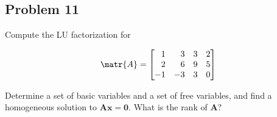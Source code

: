 \subsection{Problem 11}

Compute the LU factorization for

\begin{equation*}
    \matr{A} = 
    \begin{bmatrix}
    \phantom{-}1 & \phantom{-}3 & 3 & 2 \\
    \phantom{-}2 & \phantom{-}6 & 9 & 5 \\
    -1 & -3 & 3 & 0
    \end{bmatrix}
\end{equation*}




Determine a set of basic variables and a set of free variables, and find a homogeneous solution to $\mathbf{Ax = 0}$. What is the rank of $\mathbf{A}$? 